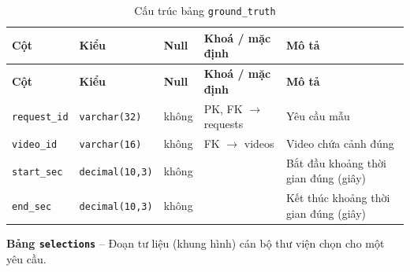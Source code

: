\setlength{\tabcolsep}{4pt}
\begin{longtable}{>{\raggedright\arraybackslash}p{}>{\raggedright\arraybackslash}p{}>{\centering\arraybackslash}p{}>{\raggedright\arraybackslash}p{}>{\raggedright\arraybackslash}p{}}
\caption{Cấu trúc bảng \texttt{ground\_truth}}\label{tab:col_ground_truth}\\
\toprule \textbf{Cột} & \textbf{Kiểu} & \textbf{Null} & \textbf{Khoá / mặc định} & \textbf{Mô tả} \\ \midrule \endfirsthead
\toprule \textbf{Cột} & \textbf{Kiểu} & \textbf{Null} & \textbf{Khoá / mặc định} & \textbf{Mô tả} \\ \midrule \endhead
\bottomrule \endfoot
\texttt{request\_id} & {\footnotesize\texttt{varchar(32)}} & không & PK, FK $\rightarrow$ requests & Yêu cầu mẫu \\
\texttt{video\_id} & {\footnotesize\texttt{varchar(16)}} & không & FK $\rightarrow$ videos & Video chứa cảnh đúng \\
\texttt{start\_sec} & {\footnotesize\texttt{decimal(10,3)}} & không &  & Bắt đầu khoảng thời gian đúng (giây) \\
\texttt{end\_sec} & {\footnotesize\texttt{decimal(10,3)}} & không &  & Kết thúc khoảng thời gian đúng (giây) \\
\end{longtable}

\textbf{Bảng \texttt{selections}} -- Đoạn tư liệu (khung hình) cán bộ thư viện chọn cho một yêu cầu.

